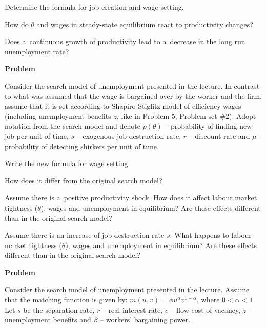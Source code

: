 \documentclass[a4paper, notitlepage, 11pt]{article}
\newcounter{zadlicz}[section]%
\newcommand{\tytul}[2]{\setcounter{equation}{0}\addtocounter{zadlicz}{1}\vspace{\abovedisplayskip}\noindent\textbf{#1\ \thezadlicz #2}}%
\begin{document}
\begin{wylicz}
 \item Determine the formula for job creation and wage setting.
 \item How do $\theta$ and wages in steady-state equilibrium react to productivity changes?
 \item Does a~continuous growth of productivity lead to a~decrease in the long run unemployment rate?
\end{wylicz}

\tytul{Problem}{}

\noindent%
Consider the search model of unemployment presented in the lecture. In contrast to what was assumed that the wage is bargained over by the worker and the firm, assume that it is set according to Shapiro-Stiglitz model of efficiency wages (including unemployment benefits $z$, like in Problem 5, Problem set \#2). Adopt notation from the search model and denote $p(\theta)$ -- probability of finding new job per unit of time, $s$ -- exogenous job destruction rate, $r$ -- discount rate and $\mu$ -- probability of detecting shirkers per unit of time.

\begin{wylicz}
 \item Write the new formula for wage setting.
 \item How does it differ from the original search model?
 \item Assume there is a~positive productivity shock. How does it affect labour market tightness ($\theta$), wages and unemployment in equilibrium? Are these effects different than in the original search model?
 \item Assume there is an increase of job destruction rate $s$. What happens to labour market tightness ($\theta$), wages and unemployment in equilibrium? Are these effects different than in the original search model?
\end{wylicz}

\tytul{Problem}{}

\noindent%
Consider the search model of unemployment presented in the lecture. Assume that the matching function is given by: $m(u,v)=\phi u^\alpha v^{1-\alpha}$, where $0<\alpha<1$. Let $s$ be the separation rate, $r$ -- real interest rate, $c$ -- flow cost of vacancy, $z$ -- unemployment benefits and $\beta$ -- workers' bargaining power.
\end{document}
